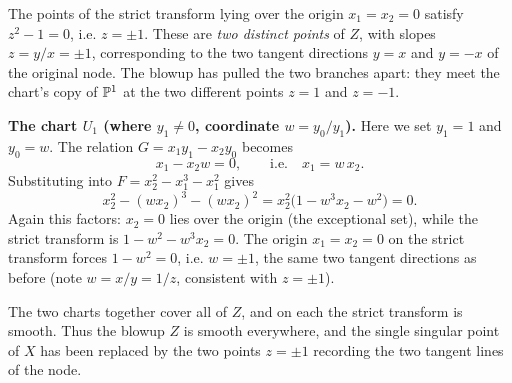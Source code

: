 \documentclass[12pt]{amsproc}
\begin{document}
    The points of the strict transform lying over the origin $x_1 = x_2 = 0$ 
    satisfy $z^2 - 1 = 0$, i.e. $z = \pm 1$. These are \emph{two distinct points} 
    of $Z$, with slopes $z = y/x = \pm 1$, corresponding to the two tangent 
    directions $y = x$ and $y = -x$ of the original node. The blowup has pulled 
    the two branches apart: they meet the chart's copy of $\P^1$ at the two 
    different points $z = 1$ and $z = -1$.

    \medskip
    \noindent\textbf{The chart $U_1$ (where $y_1 \neq 0$, coordinate $w = y_0/y_1$).}
    Here we set $y_1 = 1$ and $y_0 = w$. The relation $G = x_1 y_1 - x_2 y_0$ 
    becomes
    \[x_1 - x_2 w = 0, \qquad \text{i.e.} \quad x_1 = w\, x_2.\]
    Substituting into $F = x_2^2 - x_1^3 - x_1^2$ gives
    \[x_2^2 - (w x_2)^3 - (w x_2)^2 = x_2^2\big(1 - w^3 x_2 - w^2\big) = 0.\]
    Again this factors: $x_2 = 0$ lies over the origin (the exceptional set), 
    while the strict transform is $1 - w^2 - w^3 x_2 = 0$. The origin 
    $x_1 = x_2 = 0$ on the strict transform forces $1 - w^2 = 0$, i.e. 
    $w = \pm 1$, the same two tangent directions as before (note 
    $w = x/y = 1/z$, consistent with $z = \pm 1$).

    \medskip
    The two charts together cover all of $Z$, and on each the strict transform is 
    smooth. Thus the blowup $Z$ is smooth everywhere, and the single singular 
    point of $X$ has been replaced by the two points $z = \pm 1$ recording the 
    two tangent lines of the node.

   



\end{document}
